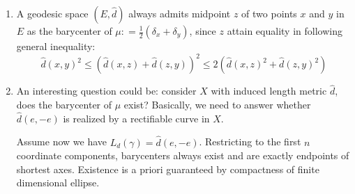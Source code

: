 \begin{rmk}
\begin{enumerate}
		\item A geodesic space $(E, \hat{d})$ always admits midpoint $z$ of two points $x$ and $y$ in $E$ as the barycenter of $\mu : = \frac{1}{2} (\delta_x + \delta_y)$, since $z$ attain equality in following general inequality:
		      \[
			      \hat{d}(x,y)^2 \leq \left(\hat{d}(x,z) + \hat{d}(z,y)\right)^2 \leq 2\left(\hat{d}(x,z)^2+ \hat{d}(z,y)^2\right)
		      \]
		\item An interesting question could be: consider $X$ with induced length metric $\hat{d}$, does the barycenter of $\mu$ exist?
		      Basically, we need to answer whether $\hat{d}(e,-e)$ is realized by a rectifiable curve in $X$.

		      Assume now we have $L_{d}(\gamma)=\hat{d}(e,-e)$.
		      Restricting to the first $n$ coordinate components, barycenters always exist and are exactly endpoints of shortest axes. Existence is a priori guaranteed by compactness of finite dimensional ellipse.


\end{enumerate}
\end{rmk}
